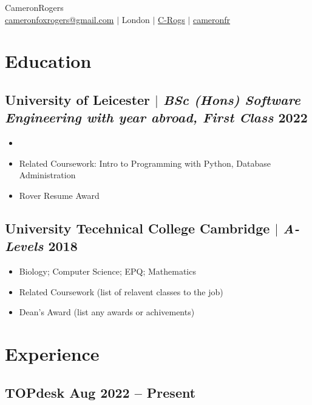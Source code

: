 \documentclass[10pt]{article}
\begin{document}
\begin{center}
    {\fontsize{32}{32}\selectfont\interthin Cameron\interheavy Rogers} \\ \bigskip
    {\color{icnclr}\faEnvelope[regular]} \href{mailto:hi@example.com}{cameronfoxrogers@gmail.com} $|$ 
    {\color{icnclr}} {London} $|$
    {\color{icnclr}} \href{https://github.com/C-Rogs}{C-Rogs} $|$
    {\color{icnclr}\faLinkedinIn} \href{https://www.linkedin.com/in/cameronfr}{cameronfr}
\end{center}

\section{Education}
\subsection{University of Leicester $|$ {\small\normalfont\textit{BSc (Hons) Software Engineering with year abroad, First Class}} \small\hfill 2022}
\begin{itemize}
    \item 
    \item Related Coursework: Intro to Programming with Python, Database Administration
    \item Rover Resume Award
\end{itemize}

\subsection{University Tecehnical College Cambridge $|$ {\small\normalfont\textit{A-Levels}} \small\hfill 2018}
\begin{itemize}
    \item Biology; Computer Science; EPQ; Mathematics 
    \item Related Coursework (list of relavent classes to the job)
    \item Dean's Award (list any awards or achivements)
\end{itemize}

\section{Experience}
\subsection{TOPdesk \small\hfill Aug 2022 -- Present}
\end{document}
